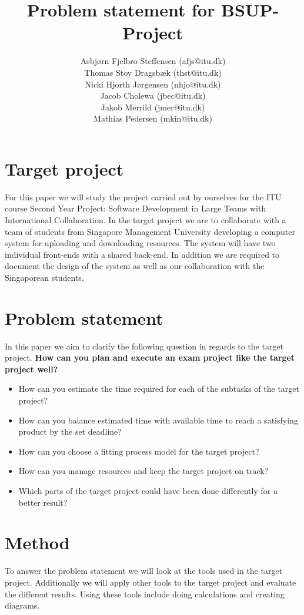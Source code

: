 \documentclass[]{article}
\title{Problem statement for BSUP-Project}
\author{Asbj\o rn Fjelbro Steffensen (afjs@itu.dk)\\ Thomas Stoy Dragsb\ae k (thst@itu.dk)\\ Nicki Hjorth J\o rgensen (nhjo@itu.dk)\\ Jacob Cholewa (jbec@itu.dk)\\ Jakob Merrild (jmer@itu.dk)\\ Mathias Pedersen (mkin@itu.dk)}
\begin{document}
\maketitle

\section*{Target project}
For this paper we will study the project carried out by ourselves for the ITU course 
Second Year Project: Software Development in Large Teams with International Collaboration.
In the target project we are to collaborate with a team of students from Singapore Management University
developing a computer system for uploading and downloading resources. The system will have two
individual front-ends with a shared back-end. In addition we are required to document the design
of the system as well as our collaboration with the Singaporean students.

\section*{Problem statement}
In this paper we aim to clarify the following question in regards to the target project.
\newline	
\textbf{How can you plan and execute an exam project like the target project well?}
\begin{itemize}
	\item	How can you estimate the time required for each of the subtasks of the target project?
	\item 	How can you balance estimated time with available time to reach a satisfying product by the set deadline?
	\item 	How can you choose a fitting process model for the target project?
	\item 	How can you manage resources and keep the target project on track?
	\item 	Which parts of the target project could have been done differently for a better result?
\end{itemize}

\section*{Method}
To answer the problem statement we will look at the tools used in the target project. Additionally we will apply other tools to the target project and evaluate the different results. Using these tools include doing calculations and creating diagrams.
\end{document}
